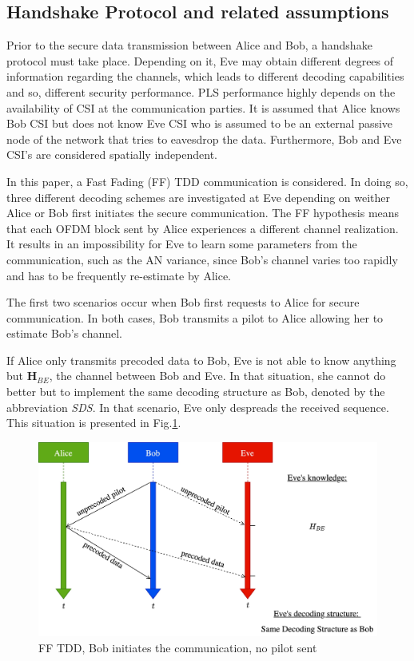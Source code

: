 \documentclass[12pt, draftclsnofoot, onecolumn]{IEEEtran}
\let\MYoriglatexcaption\caption
\renewcommand{\caption}[2][\relax]{\MYoriglatexcaption[#2]{#2}}
\begin{document}
\subsection{Handshake Protocol and related assumptions}\label{sec:establishment}
Prior to the secure data transmission between Alice and Bob, a handshake protocol must take place. Depending on it, Eve may obtain different degrees of information regarding the channels, which leads to different decoding capabilities and so, different security performance. PLS performance highly depends on the availability of CSI at the communication parties. It is assumed that Alice knows Bob CSI but does not know Eve CSI  who is assumed to be an external passive node of the network that tries to eavesdrop the data. Furthermore, Bob and Eve CSI's are considered spatially independent.

In this paper, a Fast Fading (FF) TDD communication is considered. In doing so, three different decoding schemes are investigated at Eve depending on weither Alice or Bob first initiates the secure communication. The FF hypothesis means that each OFDM block sent by Alice experiences a different channel realization. It results in an impossibility for Eve to learn some parameters from the communication, such as the AN variance, since Bob's channel varies too rapidly and has to be frequently re-estimate by Alice. 

The first two scenarios occur when Bob first requests to Alice for secure communication. In both cases, Bob transmits a pilot to Alice allowing her to estimate Bob's channel.

If Alice only transmits precoded data to Bob, Eve is not able to know anything but $\textbf{H}_{BE}$, the channel between Bob and Eve. In that situation, she cannot do better but to implement the same decoding structure as Bob, denoted by the abbreviation \textit{SDS}. In that scenario, Eve only despreads the received sequence. This situation is presented in Fig.\ref{fig_ff_tdd_b_no_pilot}.
\begin{figure}[!htb]
	\centering
	\includegraphics[width=.7\linewidth]{graphs/diagram_sequence-FF_TDD_B_no_pilot.jpg}
	\caption{FF TDD, Bob initiates the communication, no pilot sent}
	\label{fig_ff_tdd_b_no_pilot}
\end{figure} 
\end{document}
